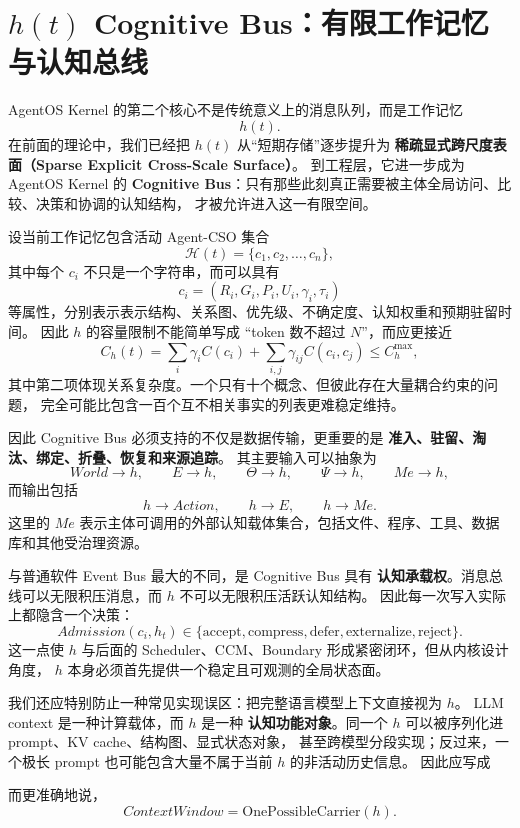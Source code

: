 \section{$h(t)$ Cognitive Bus：有限工作记忆与认知总线}

AgentOS Kernel 的第二个核心不是传统意义上的消息队列，而是工作记忆
\[
h(t).
\]
在前面的理论中，我们已经把 $h(t)$ 从``短期存储''逐步提升为
\textbf{稀疏显式跨尺度表面（Sparse Explicit Cross-Scale Surface）}。
到工程层，它进一步成为 AgentOS Kernel 的
\textbf{Cognitive Bus}：只有那些此刻真正需要被主体全局访问、比较、决策和协调的认知结构，
才被允许进入这一有限空间。

设当前工作记忆包含活动 Agent-CSO 集合
\[
\mathcal H(t)
=
\{c_1,c_2,\ldots,c_n\},
\]
其中每个 $c_i$ 不只是一个字符串，而可以具有
\[
c_i=
(R_i,G_i,P_i,U_i,\gamma_i,\tau_i)
\]
等属性，分别表示表示结构、关系图、优先级、不确定度、认知权重和预期驻留时间。
因此 $h$ 的容量限制不能简单写成 ``token 数不超过 $N$''，而应更接近
\[
C_h(t)
=
\sum_i \gamma_i C(c_i)
+
\sum_{i,j}\gamma_{ij}C(c_i,c_j)
\leq C_h^{\max},
\]
其中第二项体现关系复杂度。一个只有十个概念、但彼此存在大量耦合约束的问题，
完全可能比包含一百个互不相关事实的列表更难稳定维持。

因此 Cognitive Bus 必须支持的不仅是数据传输，更重要的是
\textbf{准入、驻留、淘汰、绑定、折叠、恢复和来源追踪}。
其主要输入可以抽象为
\[
World\rightarrow h,\qquad
E\rightarrow h,\qquad
\Theta\rightarrow h,\qquad
\Psi\rightarrow h,\qquad
Me\rightarrow h,
\]
而输出包括
\[
h\rightarrow Action,\qquad
h\rightarrow E,\qquad
h\rightarrow Me.
\]
这里的 $Me$ 表示主体可调用的外部认知载体集合，包括文件、程序、工具、数据库和其他受治理资源。

与普通软件 Event Bus 最大的不同，是 Cognitive Bus 具有
\textbf{认知承载权}。消息总线可以无限积压消息，而 $h$ 不可以无限积压活跃认知结构。
因此每一次写入实际上都隐含一个决策：
\[
Admission(c_i,h_t)\in
\{\mathrm{accept},\mathrm{compress},\mathrm{defer},
\mathrm{externalize},\mathrm{reject}\}.
\]
这一点使 $h$ 与后面的 Scheduler、CCM、Boundary 形成紧密闭环，但从内核设计角度，
$h$ 本身必须首先提供一个稳定且可观测的全局状态面。

我们还应特别防止一种常见实现误区：把完整语言模型上下文直接视为 $h$。
LLM context 是一种计算载体，而 $h$ 是一种
\textbf{认知功能对象}。同一个 $h$ 可以被序列化进 prompt、KV cache、结构图、显式状态对象，
甚至跨模型分段实现；反过来，一个极长 prompt 也可能包含大量不属于当前 $h$ 的非活动历史信息。
因此应写成
\begin{statementbox}
\centering
{}
\end{statementbox}
而更准确地说，
\[
ContextWindow
=
\mathrm{OnePossibleCarrier}(h).
\]

